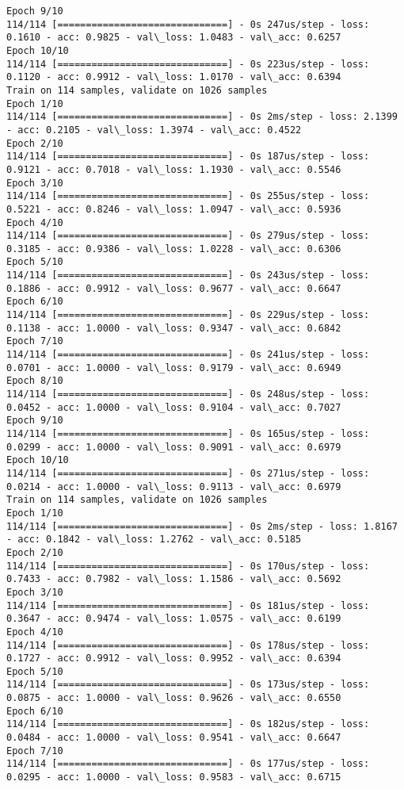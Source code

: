 \documentclass[11pt]{article}
\begin{document}
\begin{Verbatim}[commandchars=\\\{\}]
Epoch 9/10
114/114 [==============================] - 0s 247us/step - loss: 0.1610 - acc: 0.9825 - val\_loss: 1.0483 - val\_acc: 0.6257
Epoch 10/10
114/114 [==============================] - 0s 223us/step - loss: 0.1120 - acc: 0.9912 - val\_loss: 1.0170 - val\_acc: 0.6394
Train on 114 samples, validate on 1026 samples
Epoch 1/10
114/114 [==============================] - 0s 2ms/step - loss: 2.1399 - acc: 0.2105 - val\_loss: 1.3974 - val\_acc: 0.4522
Epoch 2/10
114/114 [==============================] - 0s 187us/step - loss: 0.9121 - acc: 0.7018 - val\_loss: 1.1930 - val\_acc: 0.5546
Epoch 3/10
114/114 [==============================] - 0s 255us/step - loss: 0.5221 - acc: 0.8246 - val\_loss: 1.0947 - val\_acc: 0.5936
Epoch 4/10
114/114 [==============================] - 0s 279us/step - loss: 0.3185 - acc: 0.9386 - val\_loss: 1.0228 - val\_acc: 0.6306
Epoch 5/10
114/114 [==============================] - 0s 243us/step - loss: 0.1886 - acc: 0.9912 - val\_loss: 0.9677 - val\_acc: 0.6647
Epoch 6/10
114/114 [==============================] - 0s 229us/step - loss: 0.1138 - acc: 1.0000 - val\_loss: 0.9347 - val\_acc: 0.6842
Epoch 7/10
114/114 [==============================] - 0s 241us/step - loss: 0.0701 - acc: 1.0000 - val\_loss: 0.9179 - val\_acc: 0.6949
Epoch 8/10
114/114 [==============================] - 0s 248us/step - loss: 0.0452 - acc: 1.0000 - val\_loss: 0.9104 - val\_acc: 0.7027
Epoch 9/10
114/114 [==============================] - 0s 165us/step - loss: 0.0299 - acc: 1.0000 - val\_loss: 0.9091 - val\_acc: 0.6979
Epoch 10/10
114/114 [==============================] - 0s 271us/step - loss: 0.0214 - acc: 1.0000 - val\_loss: 0.9113 - val\_acc: 0.6979
Train on 114 samples, validate on 1026 samples
Epoch 1/10
114/114 [==============================] - 0s 2ms/step - loss: 1.8167 - acc: 0.1842 - val\_loss: 1.2762 - val\_acc: 0.5185
Epoch 2/10
114/114 [==============================] - 0s 170us/step - loss: 0.7433 - acc: 0.7982 - val\_loss: 1.1586 - val\_acc: 0.5692
Epoch 3/10
114/114 [==============================] - 0s 181us/step - loss: 0.3647 - acc: 0.9474 - val\_loss: 1.0575 - val\_acc: 0.6199
Epoch 4/10
114/114 [==============================] - 0s 178us/step - loss: 0.1727 - acc: 0.9912 - val\_loss: 0.9952 - val\_acc: 0.6394
Epoch 5/10
114/114 [==============================] - 0s 173us/step - loss: 0.0875 - acc: 1.0000 - val\_loss: 0.9626 - val\_acc: 0.6550
Epoch 6/10
114/114 [==============================] - 0s 182us/step - loss: 0.0484 - acc: 1.0000 - val\_loss: 0.9541 - val\_acc: 0.6647
Epoch 7/10
114/114 [==============================] - 0s 177us/step - loss: 0.0295 - acc: 1.0000 - val\_loss: 0.9583 - val\_acc: 0.6715

\end{Verbatim}
\end{document}
